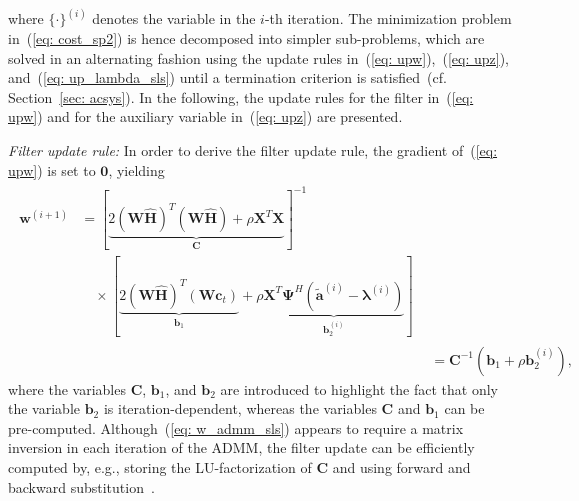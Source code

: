 \documentclass[10pt]{IEEEtran}
\begin{document}
where $\{\cdot\}^{(i)}$ denotes the variable in the $i$-th iteration.
The minimization problem in~(\ref{eq: cost_sp2}) is hence decomposed into simpler sub-problems, which are solved in an alternating fashion using the update rules in~(\ref{eq: upw}),~(\ref{eq: upz}), and~(\ref{eq: up_lambda_sls}) until a termination criterion is satisfied~(cf. Section~\ref{sec: acsys}).
In the following, the update rules for the filter in~(\ref{eq: upw}) and for the auxiliary variable in~(\ref{eq: upz}) are presented.

{\textit{Filter update rule:}} \enspace In order to derive the filter update rule, the gradient of~(\ref{eq: upw}) is set to $\mathbf{0}$, yielding 
\begin{align}
\label{eq: w_admm_sls0}
\begin{split}
\mathbf{w}^{(i+1)} & = [ \underbrace{2 (\mathbf{W}\hat{\mathbf{H}})^T(\mathbf{W}\hat{\mathbf{H}}) + \rho \mathbf{X}^T \mathbf{X}}_{\mathbf{C}} ]^{-1} \\
 &\quad \times [\underbrace{2 (\mathbf{W}\hat{\mathbf{H}})^T (\mathbf{W}\mathbf{c}_t)}_{\mathbf{b}^{}_1} + \rho \underbrace{\mathbf{X}^T \mathbf{\Psi}^H \!(\tilde{\mathbf{a}}^{(i)} - \boldsymbol{\lambda}^{(i)})}_{\mathbf{b}_2^{(i)}}]
\end{split} \\
\label{eq: w_admm_sls}
 & = \mathbf{C}^{-1} (\mathbf{b}_1 + \rho \mathbf{b}_2^{(i)}),
\end{align}
where the variables $\mathbf{C}$, $\mathbf{b}_1$, and $\mathbf{b}_2$ are introduced to highlight the fact that only the variable $\mathbf{b}_2$ is iteration-dependent, whereas the variables $\mathbf{C}$ and $\mathbf{b}_1$ can be pre-computed.
Although~(\ref{eq: w_admm_sls}) appears to require a matrix inversion in each iteration of the ADMM, the filter update can be efficiently computed by, e.g., storing the LU-factorization of $\mathbf{C}$ and using forward and backward substitution~\cite{Golub_Matrix_book}.
\end{document}
